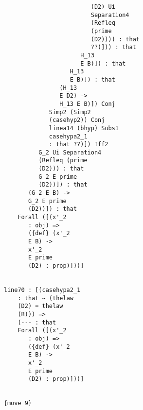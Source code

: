 \documentclass[12pt]{article}
\begin{document}
\begin{verbatim}
                                                       (D2) Ui 
                                                       Separation4 
                                                       (Refleq 
                                                       (prime 
                                                       (D2)))) : that 
                                                       ??)])) : that 
                                                    H_13 
                                                    E B)]) : that 
                                                 H_13 
                                                 E B)]) : that 
                                              (H_13 
                                              E D2) -> 
                                              H_13 E B)]) Conj 
                                           Simp2 (Simp2 
                                           (casehyp2)) Conj 
                                           linea14 (bhyp) Subs1 
                                           casehypa2_1 
                                           : that ??)]) Iff2 
                                        G_2 Ui Separation4 
                                        (Refleq (prime 
                                        (D2))) : that 
                                        G_2 E prime 
                                        (D2))]) : that 
                                     (G_2 E B) -> 
                                     G_2 E prime 
                                     (D2))]) : that 
                                  Forall ([(x'_2 
                                     : obj) => 
                                     ({def} (x'_2 
                                     E B) -> 
                                     x'_2 
                                     E prime 
                                     (D2) : prop)]))]


                              line70 : [(casehypa2_1 
                                  : that ~ (thelaw 
                                  (D2) = thelaw 
                                  (B))) => 
                                  (--- : that 
                                  Forall ([(x'_2 
                                     : obj) => 
                                     ({def} (x'_2 
                                     E B) -> 
                                     x'_2 
                                     E prime 
                                     (D2) : prop)]))]


                              {move 9}


\end{verbatim}
\end{document}
